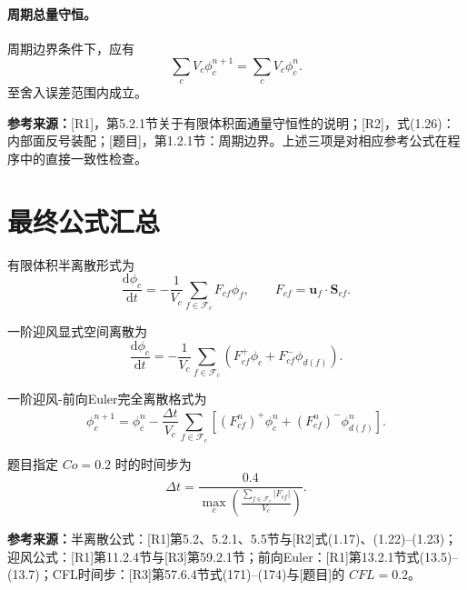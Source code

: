 \documentclass[UTF8,12pt,a4paper]{ctexart}
\numberwithin{equation}{section}
\newcommand{\Rone}{\textnormal{[R1]}}
\newcommand{\Rtwo}{\textnormal{[R2]}}
\newcommand{\Rthree}{\textnormal{[R3]}}
\newcommand{\Task}{\textnormal{[题目]}}
\newcommand{\source}[1]{%
  \par\smallskip
  \noindent\colorbox{sourcebg}{%
    \parbox{0.955\linewidth}{\footnotesize\color{sourcegray}\textbf{参考来源：}#1}%
  }
  \par\smallskip
}
\begin{document}
\paragraph{周期总量守恒。}
周期边界条件下，应有
\begin{equation}
  \sum_cV_c\phi_c^{n+1}
  =\sum_cV_c\phi_c^n.
\end{equation}
至舍入误差范围内成立。

\source{\Rone，第5.2.1节关于有限体积面通量守恒性的说明；\Rtwo，式(1.26)：内部面反号装配；\Task，第1.2.1节：周期边界。上述三项是对相应参考公式在程序中的直接一致性检查。}

\section*{最终公式汇总}

有限体积半离散形式为
\begin{equation}
  \boxed{
  \frac{\mathrm d\phi_c}{\mathrm dt}
  =-\frac{1}{V_c}\sum_{f\in\mathcal F_c}F_{cf}\phi_f,
  \qquad
  F_{cf}=\bm u_f\cdot\bm S_{cf}
  }.
\end{equation}

一阶迎风显式空间离散为
\begin{equation}
  \boxed{
  \frac{\mathrm d\phi_c}{\mathrm dt}
  =-\frac{1}{V_c}
  \sum_{f\in\mathcal F_c}
  \left(F_{cf}^+\phi_c+F_{cf}^-\phi_{d(f)}\right)
  }.
\end{equation}

一阶迎风-前向Euler完全离散格式为
\begin{equation}
  \boxed{
  \phi_c^{n+1}
  =\phi_c^n
  -\frac{\Delta t}{V_c}
  \sum_{f\in\mathcal F_c}
  \left[(F_{cf}^n)^+\phi_c^n
  +(F_{cf}^n)^-\phi_{d(f)}^n\right]
  }.
\end{equation}

题目指定 $Co=0.2$ 时的时间步为
\begin{equation}
  \boxed{
  \Delta t
  =\frac{0.4}{
    \displaystyle
    \max_c\left(
      \frac{\sum_{f\in\mathcal F_c}|F_{cf}|}{V_c}
    \right)}
  }.
\end{equation}

\source{半离散公式：\Rone 第5.2、5.2.1、5.5节与\Rtwo 式(1.17)、(1.22)--(1.23)；迎风公式：\Rone 第11.2.4节与\Rthree 第59.2.1节；前向Euler：\Rone 第13.2.1节式(13.5)--(13.7)；CFL时间步：\Rthree 第57.6.4节式(171)--(174)与\Task 的 $CFL=0.2$。}
\end{document}
